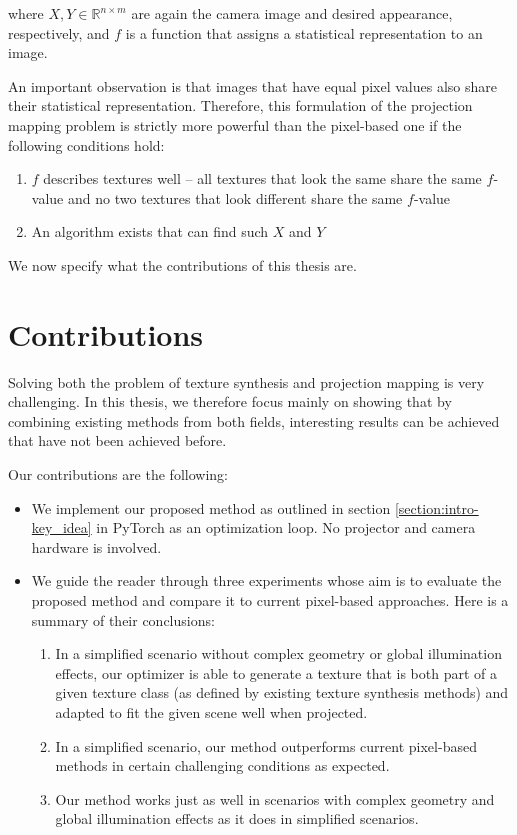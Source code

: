 where \(X,Y \in \mathbb{R}^{n \times m}\) are again the camera image and desired appearance, respectively, and \(f\) is a function that assigns a statistical representation to an image.

An important observation is that images that have equal pixel values also share their statistical representation. Therefore, this formulation of the projection mapping problem is strictly more powerful than the pixel-based one if the following conditions hold:

\begin{enumerate}
    \item \(f\) describes textures well -- all textures that look the same share the same \(f\)-value and no two textures that look different share the same \(f\)-value
    \item An algorithm exists that can find such \(X\) and \(Y\)
\end{enumerate}

We now specify what the contributions of this thesis are.

\section{Contributions}
\label{section:intro-contributions}

Solving both the problem of texture synthesis and projection mapping is very challenging. In this thesis, we therefore focus mainly on showing that by combining existing methods from both fields, interesting results can be achieved that have not been achieved before.

Our contributions are the following:

\begin{itemize}
    \item We implement our proposed method as outlined in section \ref{section:intro-key_idea} in PyTorch as an optimization loop. No projector and camera hardware is involved.
    \item We guide the reader through three experiments whose aim is to evaluate the proposed method and compare it to current pixel-based approaches. Here is a summary of their conclusions:
    \begin{enumerate}
        \item In a simplified scenario without complex geometry or global illumination effects, our optimizer is able to generate a texture that is both part of a given texture class (as defined by existing texture synthesis methods) and adapted to fit the given scene well when projected.
        \item In a simplified scenario, our method outperforms current pixel-based methods in certain challenging conditions as expected.
        \item Our method works just as well in scenarios with complex geometry and global illumination effects as it does in simplified scenarios.
    \end{enumerate}
\end{itemize}

